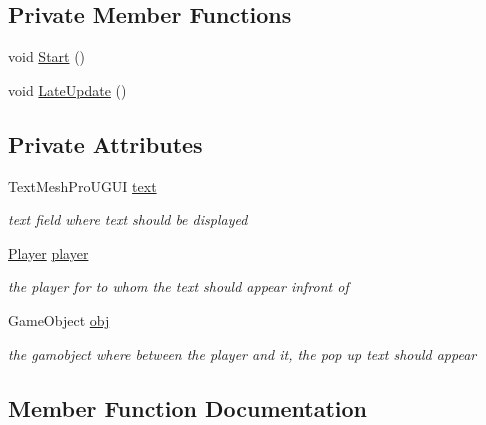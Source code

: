 \subsection*{Private Member Functions}
\begin{DoxyCompactItemize}
\item 
void \mbox{\hyperlink{class_interaction_prompt_ada65c2aa759ea18aa2ccf6ba8cd3843b}{Start}} ()
\item 
void \mbox{\hyperlink{class_interaction_prompt_abdf8e29663a41a36dc2db027f3187c49}{Late\+Update}} ()
\end{DoxyCompactItemize}
\subsection*{Private Attributes}
\begin{DoxyCompactItemize}
\item 
Text\+Mesh\+Pro\+U\+G\+UI \mbox{\hyperlink{class_interaction_prompt_a4636f2a267626c679099028ef84aecf7}{text}}
\begin{DoxyCompactList}\small\item\em text field where text should be displayed \end{DoxyCompactList}\item 
\mbox{\hyperlink{class_player}{Player}} \mbox{\hyperlink{class_interaction_prompt_a4fbdf117c9d51678d8e74c32b04e206a}{player}}
\begin{DoxyCompactList}\small\item\em the player for to whom the text should appear infront of \end{DoxyCompactList}\item 
Game\+Object \mbox{\hyperlink{class_interaction_prompt_a2ede1aad42e153f5b4a3fafe4233e8be}{obj}}
\begin{DoxyCompactList}\small\item\em the gamobject where between the player and it, the pop up text should appear \end{DoxyCompactList}\end{DoxyCompactItemize}


\subsection{Member Function Documentation}
\mbox{\label{class_interaction_prompt_abdf8e29663a41a36dc2db027f3187c49}} 
